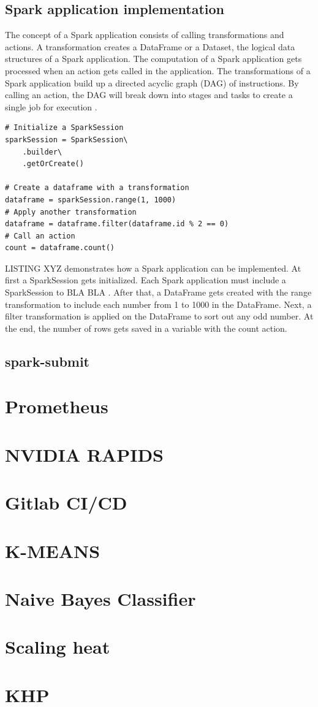 \subsection{Spark application implementation}
The concept of a Spark application consists of calling transformations and actions. A transformation creates a DataFrame or a Dataset, the logical data structures of a Spark application. The computation of a Spark application gets processed when an action gets called in the application. The transformations of a Spark application build up a directed acyclic graph (DAG) of instructions. By calling an action, the DAG will break down into stages and tasks to create a single job for execution \cite{Chambers2018Spark}.
\begin{lstlisting}[frame=single, caption=Example of a Python 3 Spark application, captionpos=b]
# Initialize a SparkSession
sparkSession = SparkSession\
    .builder\
    .getOrCreate()

# Create a dataframe with a transformation
dataframe = sparkSession.range(1, 1000)
# Apply another transformation
dataframe = dataframe.filter(dataframe.id % 2 == 0)
# Call an action
count = dataframe.count()
\end{lstlisting}
LISTING XYZ demonstrates how a Spark application can be implemented. At first a SparkSession gets initialized. Each Spark application must include a SparkSession to BLA BLA \cite{Chambers2018Spark}. After that, a DataFrame gets created with the range transformation to include each number from 1 to 1000 in the DataFrame. Next, a filter transformation is applied on the DataFrame to sort out any odd number. At the end, the number of rows gets saved in a variable with the count action.


\subsection{spark-submit}


\section{Prometheus}


\section{NVIDIA RAPIDS}


\section{Gitlab CI/CD}


\section{K-MEANS}


\section{Naive Bayes Classifier}


\section{Scaling heat}


\section{KHP}